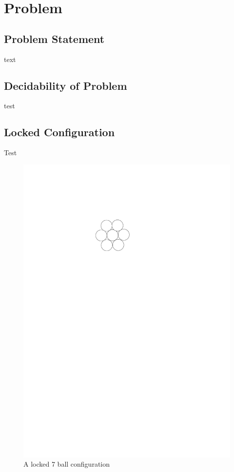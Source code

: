 \section{Problem}
\subsection{Problem Statement} text
\subsection{Decidability of Problem} test
\subsection{Locked Configuration}
Test
\begin{figure}[ht]
\begin{center}
\includegraphics{graphics/7ballLocked.pdf}
\caption{A locked 7 ball configuration}
\label{figure:7ballLocked}
\end{center} 
\end{figure}
